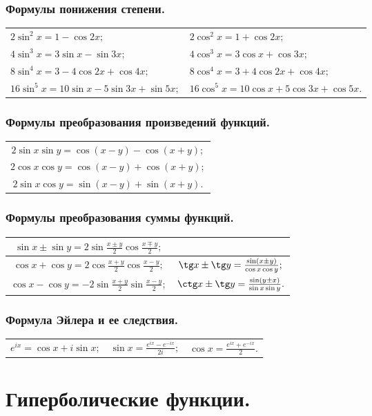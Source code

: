 \subsubsection{Формулы понижения степени.}
\begin{tabular}{ l l }
$2\sin^2x=1-\cos 2x;$
&
$2\cos^2x=1+\cos 2x;$
\\
$4\sin^3x=3\sin x-\sin 3x;$
&
$4\cos^3x=3\cos x+\cos 3x;$
\\
$8\sin^4x=3-4\cos2x+\cos4x;$
&
$8\cos^4x=3+4\cos2x+\cos4x;$
\\
$16\sin^5x=10\sin x-5\sin 3x +\sin 5x;$
&
$16\cos^5x=10\cos x+5\cos 3x +\cos 5x.$
\end{tabular}
\subsubsection{Формулы преобразования произведений функций.}
\begin{tabular}{c}
$2\sin x \sin y = \cos (x-y)-\cos(x+y);$
\\
$2\cos x \cos y = \cos (x-y)+\cos(x+y);$
\\
$2\sin x \cos y = \sin (x-y)+\sin(x+y).$
\end{tabular}
\subsubsection{Формулы преобразования суммы функций.}
\begin{tabular}{|c|c|}
$\sin x\pm \sin y =2 \sin \frac{x\pm y}{2} \cos \frac{x\mp y}{2};$
&
$ $
\\\hline
$\cos x + \cos y  = 2 \cos \frac{x + y}{2} \cos \frac{x - y}{2};$
&
$\tg x \pm \tg y = \frac{\sin (x \pm y)}{ \cos x \cos y};$
\\\hline
$\cos x - \cos y  = -2 \sin \frac{x + y}{2} \sin\frac{x - y}{2};$
&
$\ctg x \pm \tg y = \frac{\sin (y \pm x)}{ \sin x \sin y}.$
\end{tabular}
\subsubsection{Формула Эйлера и ее следствия.}
\begin{tabular}{c c c}
$e^{ix} = \cos x + i \sin x;$
&
$\sin x = \frac{e^{ix}-e^{-ix}}{2i};$
&
$\cos x = \frac{e^{ix}+e^{-ix}}{2}.$
\end{tabular}
\section{Гиперболические функции.}

